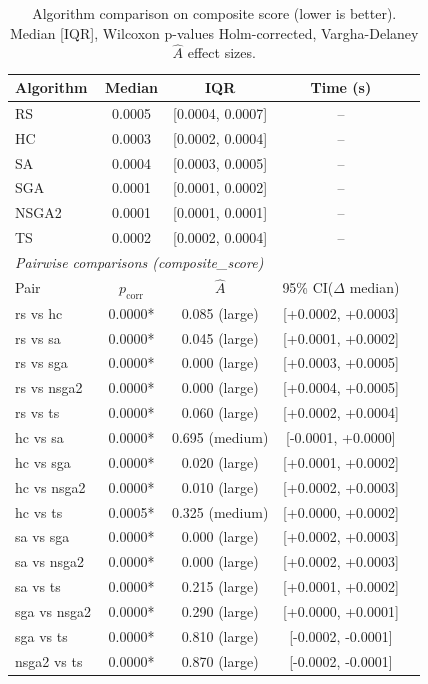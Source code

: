 \begin{table}[ht]
\centering
\caption{Algorithm comparison on composite score (lower is better). Median [IQR], Wilcoxon p-values Holm-corrected, Vargha-Delaney $\hat{A}$ effect sizes.}
\label{tab:algorithm_comparison}
\begin{tabular}{lcccc}
\toprule
Algorithm & Median & IQR & Time (s) \\
\midrule
  RS & 0.0005 & [0.0004, 0.0007] & -- \\
  HC & 0.0003 & [0.0002, 0.0004] & -- \\
  SA & 0.0004 & [0.0003, 0.0005] & -- \\
  SGA & 0.0001 & [0.0001, 0.0002] & -- \\
  NSGA2 & 0.0001 & [0.0001, 0.0001] & -- \\
  TS & 0.0002 & [0.0002, 0.0004] & -- \\
\midrule
\multicolumn{4}{l}{\textit{Pairwise comparisons (composite\_score)}} \\
Pair & $p_{\text{corr}}$ & $\hat{A}$ & 95\% CI($\Delta$ median) \\
\midrule
  rs vs hc & 0.0000* & 0.085 (large) & [+0.0002, +0.0003] \\
  rs vs sa & 0.0000* & 0.045 (large) & [+0.0001, +0.0002] \\
  rs vs sga & 0.0000* & 0.000 (large) & [+0.0003, +0.0005] \\
  rs vs nsga2 & 0.0000* & 0.000 (large) & [+0.0004, +0.0005] \\
  rs vs ts & 0.0000* & 0.060 (large) & [+0.0002, +0.0004] \\
  hc vs sa & 0.0000* & 0.695 (medium) & [-0.0001, +0.0000] \\
  hc vs sga & 0.0000* & 0.020 (large) & [+0.0001, +0.0002] \\
  hc vs nsga2 & 0.0000* & 0.010 (large) & [+0.0002, +0.0003] \\
  hc vs ts & 0.0005* & 0.325 (medium) & [+0.0000, +0.0002] \\
  sa vs sga & 0.0000* & 0.000 (large) & [+0.0002, +0.0003] \\
  sa vs nsga2 & 0.0000* & 0.000 (large) & [+0.0002, +0.0003] \\
  sa vs ts & 0.0000* & 0.215 (large) & [+0.0001, +0.0002] \\
  sga vs nsga2 & 0.0000* & 0.290 (large) & [+0.0000, +0.0001] \\
  sga vs ts & 0.0000* & 0.810 (large) & [-0.0002, -0.0001] \\
  nsga2 vs ts & 0.0000* & 0.870 (large) & [-0.0002, -0.0001] \\
\bottomrule
\end{tabular}
\end{table}
